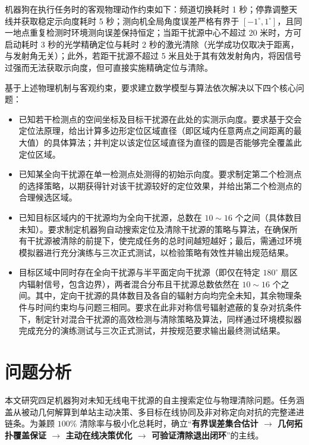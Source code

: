 \documentclass[zihao=-4,a4paper,UTF8]{ctexart}
\begin{document}
机器狗在执行任务时的客观物理动作约束如下：频道切换耗时 1 秒；停靠调整天线并获取稳定示向度耗时 5 秒；测向机全局角度误差严格有界于 $[-1^\circ, 1^\circ]$，且同一地点重复检测时环境测向误差保持恒定；当距干扰源中心不超过 20 米时，方可启动耗时 3 秒的光学精确定位与耗时 2 秒的激光清除（光学成功仅取决于距离，与发射角无关）；此外，若距干扰源不超过 5 米且处于其有效发射角内，将因信号过强而无法获取示向度，但可直接实施精确定位与清除。

基于上述物理机制与客观约束，要求建立数学模型与算法依次解决以下四个核心问题：

\begin{itemize}[leftmargin=2.5em, itemsep=0.6em, topsep=0.4em]
  \item[\textbf{问题一}] 已知若干检测点的空间坐标及目标干扰源在此处的实测示向度。要求基于交会定位法原理，给出计算多边形定位区域直径（即区域内任意两点之间距离的最大值）的具体算法；并判定以该定位区域直径为直径的圆是否能够完全覆盖此定位区域。

  \item[\textbf{问题二}] 已知某全向干扰源在单一检测点处测得的初始示向度。要求制定第二个检测点的选择策略，以期获得针对该干扰源较好的定位效果，并给出第二个检测点的合理候选区域。

  \item[\textbf{问题三}] 已知目标区域内的干扰源均为全向干扰源，总数在 $10\sim 16$ 个之间（具体数目未知）。要求制定机器狗自动搜索定位及清除干扰源的策略与算法，在确保所有干扰源被清除的前提下，使完成任务的总时间越短越好；最后，需通过环境模拟器进行充分演练与三次正式测试，以检验策略有效性并输出规范结果。

  \item[\textbf{问题四}] 目标区域中同时存在全向干扰源与半平面定向干扰源（即仅在特定 $180^\circ$ 扇区内辐射信号，包含边界），两者混合分布且干扰源总数依然在 $10\sim 16$ 个之间。其中，定向干扰源的具体数目及各自的辐射方向均完全未知，其余物理条件与时间约束均与问题三相同。要求在此非对称信号辐射遮蔽的复杂对抗条件下，制定针对混合干扰源的高效检测与清除策略及算法，同样通过环境模拟器完成充分的演练测试与三次正式测试，并按规范要求输出最终测试结果。
\end{itemize}


\section{问题分析}

本文研究四足机器狗对未知无线电干扰源的自主搜索定位与物理清除问题。任务涵盖从被动几何解算到单站主动决策、多目标在线协同及非对称定向对抗的完整递进链条。为兼顾 $100\%$ 清除率与极小化总耗时，确立“\textbf{有界误差集合估计 $\to$ 几何拓扑覆盖保证 $\to$ 主动在线决策优化 $\to$ 可验证清除退出闭环}”的主线。
\end{document}
